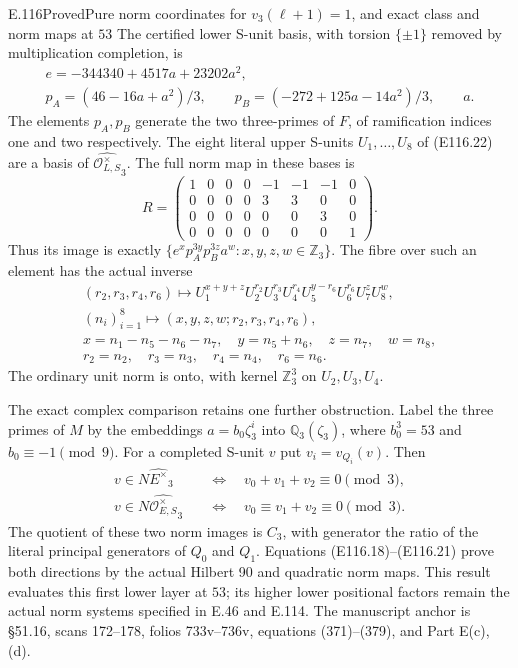 \begin{statement}{E.116}{Proved}{Pure norm coordinates for $v_3(\ell+1)=1$, and exact class and norm maps at $53$}
The certified lower S-unit basis, with torsion $\{\pm1\}$
removed by multiplication completion, is
\[
 \begin{gathered}
 e=-344340+4517a+23202a^2,\\
 p_A=(46-16a+a^2)/3,\qquad
 p_B=(-272+125a-14a^2)/3,\qquad a.
 \end{gathered}
 \tag{E116.8}
\]
The elements $p_A,p_B$ generate the two three-primes of
$F$, of ramification indices one and two respectively.
The eight literal upper S-units $U_1,\ldots,U_8$ of
(E116.22) are a basis of $\widehat{\mathcal O_{L,S}^\times}_3$.
The full norm map in these bases is
\[
 R=\begin{pmatrix}
 1&0&0&0&-1&-1&-1&0\\
 0&0&0&0&3&3&0&0\\
 0&0&0&0&0&0&3&0\\
 0&0&0&0&0&0&0&1
 \end{pmatrix}.
 \tag{E116.9}
\]
Thus its image is exactly
$\{e^x p_A^{3y}p_B^{3z}a^w:x,y,z,w\in\mathbb Z_3\}$.
The fibre over such an element has the actual inverse
\[
 \begin{gathered}
 (r_2,r_3,r_4,r_6)\longmapsto
 U_1^{x+y+z}U_2^{r_2}U_3^{r_3}U_4^{r_4}
 U_5^{y-r_6}U_6^{r_6}U_7^zU_8^w,\\
 (n_i)_{i=1}^8\longmapsto(x,y,z,w;r_2,r_3,r_4,r_6),\\
 x=n_1-n_5-n_6-n_7,\quad y=n_5+n_6,\quad z=n_7,\quad w=n_8,\\
 r_2=n_2,\quad r_3=n_3,\quad r_4=n_4,\quad r_6=n_6.
 \end{gathered}
 \tag{E116.10}
\]
The ordinary unit norm is onto, with kernel
$\mathbb Z_3^3$ on $U_2,U_3,U_4$.

The exact complex comparison retains one further obstruction.
Label the three primes of $M$ by the embeddings
$a=b_0\zeta_3^i$ into $\mathbb Q_3(\zeta_3)$, where
$b_0^3=53$ and $b_0\equiv-1\pmod9$.
For a completed S-unit $v$ put $v_i=v_{Q_i}(v)$.
Then
\[
 \begin{aligned}
 v\in N\widehat{E^\times}_3
       &\quad\Longleftrightarrow\quad v_0+v_1+v_2\equiv0\pmod3,\\
 v\in N\widehat{\mathcal O_{E,S}^\times}_3
       &\quad\Longleftrightarrow\quad
             v_0\equiv v_1+v_2\equiv0\pmod3.
 \end{aligned}
 \tag{E116.11}
\]
The quotient of these two norm images is $C_3$, with
generator the ratio of the literal principal generators
of $Q_0$ and $Q_1$. Equations (E116.18)--(E116.21) prove
both directions by the actual Hilbert 90 and quadratic
norm maps. This result evaluates this first lower layer
at $53$; its higher lower positional factors remain the
actual norm systems specified in E.46 and E.114.
The manuscript anchor is \S51.16, scans 172--178,
folios 733v--736v, equations (371)--(379), and Part E(c),(d).
\end{statement}

